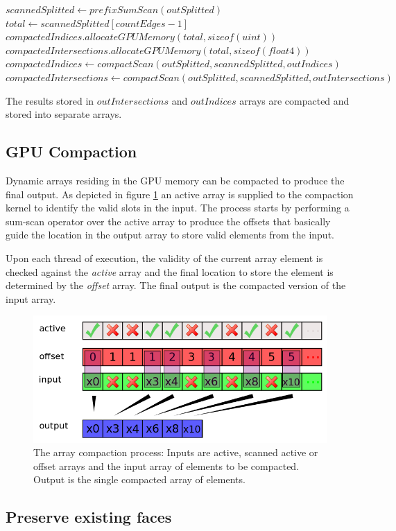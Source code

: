 \begin{algorithm}[H]
\caption{\textit{ScanEdgeIntersections}: Counts and compacts edge-intersections using
prefix-sum scan primitives. The inputs to this stage are the outputs of algorithm \ref{alg:edgeIntersections} }

\label{alg:compactEdgeIntersections}
\begin{algorithmic}[1]	
  \STATE $scannedSplitted \gets prefixSumScan(outSplitted)$
  \STATE $total \gets scannedSplitted[countEdges-1]$
  \STATE $compactedIndices.allocateGPUMemory(total, sizeof(uint))$
  \STATE $compactedIntersections.allocateGPUMemory(total, sizeof(float4))$
  \STATE $compactedIndices \gets compactScan(outSplitted, scannedSplitted, outIndices)$
  \STATE $compactedIntersections \gets compactScan(outSplitted, scannedSplitted, outIntersections)$
\end{algorithmic}
\end{algorithm}

The results stored in $outIntersections$ and $outIndices$ arrays are compacted and stored into separate arrays.

\subsection{GPU Compaction}
Dynamic arrays residing in the GPU memory can be compacted to produce the final output.
As depicted in figure \ref{fig:compactkernel} an active array is supplied to the compaction kernel 
to identify the valid slots in the input. The process starts by performing a sum-scan operator over the active array
to produce the offsets that basically guide the location in the output array to store valid elements from the input. 

Upon each thread of execution, the validity of the current array element is checked against the \textit{active} array 
and the final location to store the element is determined by the \textit{offset} array. The final output is the 
compacted version of the input array.


\begin{figure}[H]
  \centering
  \includegraphics[width=0.8\linewidth]{figures/cutting/compactkernel.png}
  \caption{\label{fig:compactkernel}
  {The array compaction process: Inputs are active, scanned active or offset arrays and the input array of elements to be compacted.
  Output is the single compacted array of elements.}
}
\end{figure}

\subsection{Preserve existing faces}



